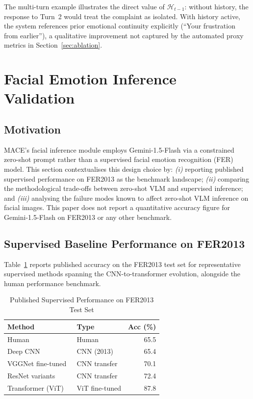 \documentclass[sigconf, review=true]{acmart}
\begin{document}
The multi-turn example illustrates the direct value of
$\mathcal{H}_{t-1}$: without history, the response to Turn~2
would treat the complaint as isolated.
With history active, the system references prior emotional
continuity explicitly (``Your frustration from earlier''),
a qualitative improvement not captured by the automated
proxy metrics in Section~\ref{sec:ablation}.

\section{Facial Emotion Inference Validation}
\label{sec:facial}

\subsection{Motivation}

MACE's facial inference module employs Gemini-1.5-Flash via
a constrained zero-shot prompt rather than a supervised
facial emotion recognition (FER) model.
This section contextualises this design choice by:
\textit{(i)} reporting published supervised performance on
FER2013 as the benchmark landscape;
\textit{(ii)} comparing the methodological trade-offs between
zero-shot VLM and supervised inference; and
\textit{(iii)} analysing the failure modes known to affect
zero-shot VLM inference on facial images.
This paper does not report a quantitative accuracy figure for
Gemini-1.5-Flash on FER2013 or any other benchmark.

\subsection{Supervised Baseline Performance on FER2013}

Table~\ref{tab:fer_baselines} reports published accuracy on
the FER2013 test set for representative supervised methods
spanning the CNN-to-transformer evolution, alongside the
human performance benchmark.

\begin{table}[htbp]
\centering
\caption{Published Supervised Performance on FER2013 Test Set}
\label{tab:fer_baselines}
\begin{tabular}{llr}
\toprule
\textbf{Method} & \textbf{Type} & \textbf{Acc (\%)} \\
\midrule
Human~\cite{goodfellow2013fer}            & Human          & 65.5 \\
Deep CNN~\cite{goodfellow2013fer}         & CNN (2013)     & 65.4 \\
VGGNet fine-tuned~\cite{li2022fer_survey} & CNN transfer   & 70.1 \\
ResNet variants~\cite{li2022fer_survey}   & CNN transfer   & 72.4 \\
Transformer (ViT)~\cite{li2022fer_survey} & ViT fine-tuned & 87.8 \\
\bottomrule
\end{tabular}
\end{table}
\end{document}

